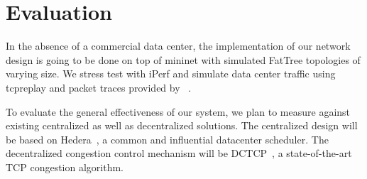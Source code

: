 
\section{Evaluation}
\label{sec:evaluation}

In the absence of a commercial data center, the implementation of our network 
design is going to be done on top of mininet with simulated FatTree topologies 
of varying size. We stress test with iPerf and simulate data center traffic 
using tcpreplay and packet traces provided by~\cite{traffic} .

To evaluate the general effectiveness of our system, we plan to measure against 
existing centralized as well as decentralized solutions.
The centralized design will be based on Hedera~\cite{hedera}, a common and 
influential datacenter scheduler. The decentralized congestion control 
mechanism will be DCTCP~\cite{dctcp}, a state-of-the-art TCP congestion 
algorithm.


